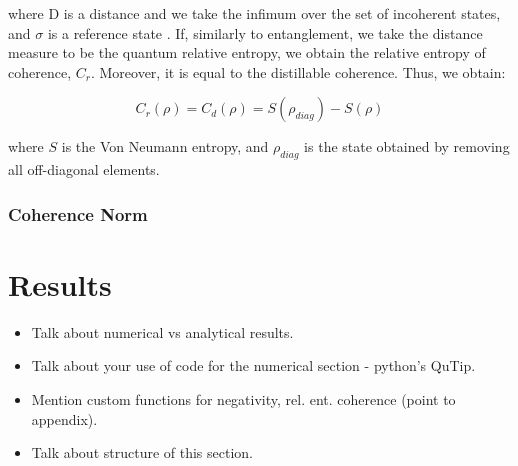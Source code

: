 \documentclass[12pt]{article}
\begin{document}
where D is a distance and we take the infimum over the set of incoherent states, and $\sigma$ is a reference state \cite{Coherence2017-Colloquium}. If, similarly to entanglement, we take the distance measure to be the quantum relative entropy, we obtain the relative entropy of coherence, $C_r$. Moreover, it is equal to the distillable coherence. Thus, we obtain:

\begin{equation}
C_r(\rho) = C_d(\rho) = S(\rho_{diag}) - S(\rho)
\end{equation}

where $S$ is the Von Neumann entropy, and $\rho_{diag}$ is the state obtained by removing all off-diagonal elements.
\subsubsection{Coherence Norm}


























































\newpage
\section{Results} \label{results}
\begin{itemize}
    \item Talk about numerical vs analytical results.
    \item Talk about your use of code for the numerical section - python's QuTip. 
    \item Mention custom functions for negativity, rel. ent. coherence (point to appendix).
    \item Talk about structure of this section. 
\end{itemize}
\end{document}
